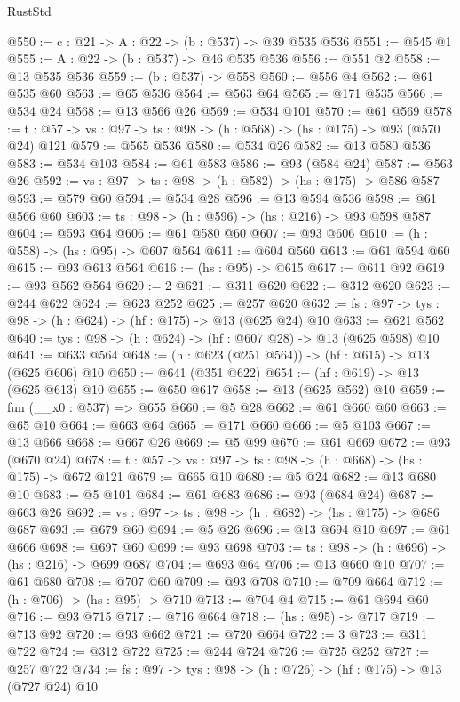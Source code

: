 \begin{lexlean}{RustStd}
\begin{coremodule}
@550 := {c : @21} -> {A : @22} -> (b : @537) -> @39 @535 @536
@551 := @545 @1
@555 := {A : @22} -> (b : @537) -> @46 @535 @536
@556 := @551 @2
@558 := @13 @535 @536
@559 := (b : @537) -> @558
@560 := @556 @4
@562 := @61 @535 @60
@563 := @65 @536
@564 := @563 @64
@565 := @171 @535
@566 := @534 @24
@568 := @13 @566 @26
@569 := @534 @101
@570 := @61 @569
@578 := {t : @57} -> {vs : @97} -> {ts : @98} -> (h : @568) -> (hs : @175) -> @93 (@570 @24) @121
@579 := @565 @536
@580 := @534 @26
@582 := @13 @580 @536
@583 := @534 @103
@584 := @61 @583
@586 := @93 (@584 @24)
@587 := @563 @26
@592 := {vs : @97} -> {ts : @98} -> (h : @582) -> (hs : @175) -> @586 @587
@593 := @579 @60
@594 := @534 @28
@596 := @13 @594 @536
@598 := @61 @566 @60
@603 := {ts : @98} -> (h : @596) -> (hs : @216) -> @93 @598 @587
@604 := @593 @64
@606 := @61 @580 @60
@607 := @93 @606
@610 := (h : @558) -> (hs : @95) -> @607 @564
@611 := @604 @560
@613 := @61 @594 @60
@615 := @93 @613 @564
@616 := (hs : @95) -> @615
@617 := @611 @92
@619 := @93 @562 @564
@620 := 2
@621 := @311 @620
@622 := @312 @620
@623 := @244 @622
@624 := @623 @252
@625 := @257 @620
@632 := {fs : @97} -> {tys : @98} -> (h : @624) -> (hf : @175) -> @13 (@625 @24) @10
@633 := @621 @562
@640 := {tys : @98} -> (h : @624) -> (hf : @607 @28) -> @13 (@625 @598) @10
@641 := @633 @564
@648 := (h : @623 (@251 @564)) -> (hf : @615) -> @13 (@625 @606) @10
@650 := @641 (@351 @622)
@654 := (hf : @619) -> @13 (@625 @613) @10
@655 := @650 @617
@658 := @13 (@625 @562) @10
@659 := fun (__x0 : @537) => @655
@660 := @5 @28
@662 := @61 @660 @60
@663 := @65 @10
@664 := @663 @64
@665 := @171 @660
@666 := @5 @103
@667 := @13 @666
@668 := @667 @26
@669 := @5 @99
@670 := @61 @669
@672 := @93 (@670 @24)
@678 := {t : @57} -> {vs : @97} -> {ts : @98} -> (h : @668) -> (hs : @175) -> @672 @121
@679 := @665 @10
@680 := @5 @24
@682 := @13 @680 @10
@683 := @5 @101
@684 := @61 @683
@686 := @93 (@684 @24)
@687 := @663 @26
@692 := {vs : @97} -> {ts : @98} -> (h : @682) -> (hs : @175) -> @686 @687
@693 := @679 @60
@694 := @5 @26
@696 := @13 @694 @10
@697 := @61 @666
@698 := @697 @60
@699 := @93 @698
@703 := {ts : @98} -> (h : @696) -> (hs : @216) -> @699 @687
@704 := @693 @64
@706 := @13 @660 @10
@707 := @61 @680
@708 := @707 @60
@709 := @93 @708
@710 := @709 @664
@712 := (h : @706) -> (hs : @95) -> @710
@713 := @704 @4
@715 := @61 @694 @60
@716 := @93 @715
@717 := @716 @664
@718 := (hs : @95) -> @717
@719 := @713 @92
@720 := @93 @662
@721 := @720 @664
@722 := 3
@723 := @311 @722
@724 := @312 @722
@725 := @244 @724
@726 := @725 @252
@727 := @257 @722
@734 := {fs : @97} -> {tys : @98} -> (h : @726) -> (hf : @175) -> @13 (@727 @24) @10

\end{coremodule}
\end{lexlean}
